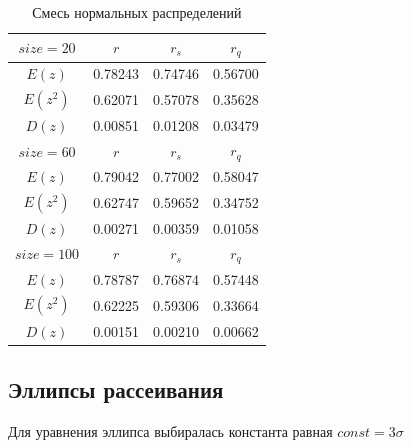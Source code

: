 \begin{table}[H]
	\begin{center}
		\begin{tabular}{|c||c|c|c|}
			\hline
			$size = 20$ & $r$ & $r_s$ & $r_q$ \\ 
			\hline 
			$E(z)$ & 0.78243 & 0.74746 & 0.56700 \\ 
			\hline 
			$E(z^2)$ & 0.62071 & 0.57078 & 0.35628 \\ 
			\hline 
			$D(z)$ & 0.00851 & 0.01208 & 0.03479 \\ 
			\hline \hline 
			$size = 60$ & $r$ & $r_s$ & $r_q$ \\ 
			\hline 
			$E(z)$ & 0.79042 & 0.77002 & 0.58047 \\ 
			\hline 
			$E(z^2)$ & 0.62747 & 0.59652 & 0.34752 \\ 
			\hline 
			$D(z)$ & 0.00271 & 0.00359 & 0.01058 \\ 
			\hline \hline 
			$size = 100$ & $r$ & $r_s$ & $r_q$ \\ 
			\hline 
			$E(z)$ & 0.78787 & 0.76874 & 0.57448 \\ 
			\hline 
			$E(z^2)$ & 0.62225 & 0.59306 & 0.33664 \\ 
			\hline 
			$D(z)$ & 0.00151 & 0.00210 & 0.00662 \\ 
			\hline 
		\end{tabular}
	\end{center}
	\caption{Смесь нормальных распределений}
\end{table} 

\subsection{Эллипсы рассеивания}

Для уравнения эллипса выбиралась константа равная $const = 3\sigma$

